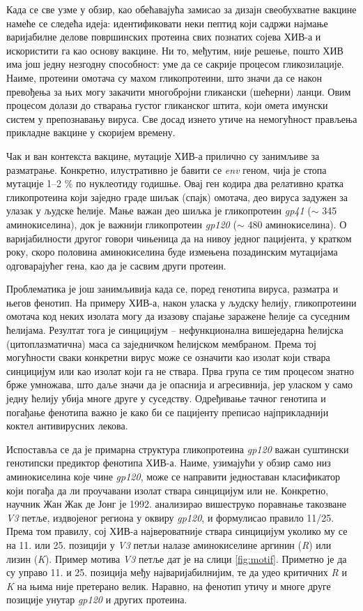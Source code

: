 \documentclass[12pt,oneside]{memoir}
\begin{document}
\begin{CJK}{UTF8}{ipxm}
Када се све узме у обзир, као обећавајућа замисао за дизајн свеобухватне вакцине намеће се следећа идеја: идентификовати неки пептид који садржи најмање варијабилне делове површинских протеина свих познатих сојева ХИВ-а и искористити га као основу вакцине. Ни то, међутим, није решење, пошто ХИВ има још једну незгодну способност: уме да се сакрије процесом гликозилације. Наиме, протеини омотача су махом гликопротеини, што значи да се након превођења за њих могу закачити многобројни гликански (шећерни) ланци. Овим процесом долази до стварања густог гликанског штита, који омета имунски систем у препознавању вируса. Све досад изнето утиче на немогућност прављења прикладне вакцине у скоријем времену.

Чак и ван контекста вакцине, мутације ХИВ-а прилично су занимљиве за разматрање. Конкретно, илустративно је бавити се \textit{env} геном, чија је стопа мутације 1--2 \% по нуклеотиду годишње. Овај ген кодира два релативно кратка гликопротеина који заједно граде шиљак (спајк) омотача, део вируса задужен за улазак у људске ћелије. Мање важан део шиљка је гликопротеин \textit{gp41} ($\sim$ 345 аминокиселина), док је важнији гликопротеин \textit{gp120} ($\sim$ 480 аминокиселина). О варијабилности другог говори чињеница да на нивоу једног пацијента, у кратком року, скоро половина аминокиселина буде измењена позадинским мутацијама одговарајућег гена, као да је сасвим други протеин.

Проблематика је још занимљивија када се, поред генотипа вируса, разматра и његов фенотип. На примеру ХИВ-а, након уласка у људску ћелију, гликопротеини омотача код неких изолата могу да изазову спајање заражене ћелије са суседним ћелијама. Резултат тога је синцицијум -- нефункционална вишеједарна ћелијска (цитоплазматична) маса са заједничком ћелијском мембраном. Према тој могућности сваки конкретни вирус може се означити као изолат који ствара синцицијум или као изолат који га не ствара. Прва група се тим процесом знатно брже умножава, што даље значи да је опаснија и агресивнија, јер уласком у само једну ћелију убија многе друге у суседству. Одређивање тачног генотипа и погађање фенотипа важно је како би се пацијенту преписао најприкладнији коктел антивирусних лекова.

Испоставља се да је примарна структура гликопротеина \textit{gp120} важан суштински генотипски предиктор фенотипа ХИВ-а. Наиме, узимајући у обзир само низ аминокиселина које чине \textit{gp120}, може се направити једноставан класификатор који погађа да ли проучавани изолат ствара синцицијум или не. Конкретно, научник Жан Жак де Јонг је 1992. анализирао вишеструко поравнање такозване \textit{V3} петље, издвојеног региона у оквиру \textit{gp120}, и формулисао правило 11/25\cite{jong1992}. Према том правилу, сој ХИВ-а највероватније ствара синцицијум уколико му се на 11. или 25. позицији у \textit{V3} петљи налазе аминокиселине аргинин (\textit{R}) или лизин (\textit{K}). Пример мотива \textit{V3} петље дат је на слици \ref{fig:motif}. Приметно је да су управо 11. и 25. позиција међу најваријабилнијим, те да удео критичних \textit{R} и \textit{K} на њима није претерано велик. Наравно, на фенотип утичу и многе друге позиције унутар \textit{gp120} и других протеина.


\end{CJK}
\end{document}
